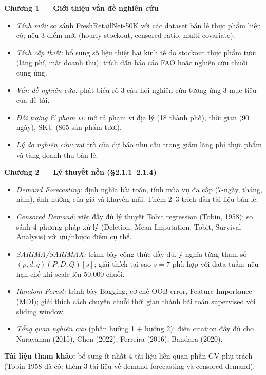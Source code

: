 \documentclass[12pt,a4paper]{report}
\newcommand{\ownerGV}{\colorbox{green!20}{\textbf{[GV] Gia Văn}}}
\begin{document}
\begin{tcolorbox}[colback=green!4, colframe=green!55!black,
    title=\bfseries \ownerGV\ — Nhiệm vụ chi tiết]

\textbf{Chương 1 — Giới thiệu vấn đề nghiên cứu}
\begin{itemize}[leftmargin=1.5em, itemsep=1pt]
    \item[\S1.1] \textit{Tính mới:} so sánh FreshRetailNet-50K với các dataset bán lẻ thực phẩm hiện có; nêu 3 điểm mới (hourly stockout, censored ratio, multi-covariate).
    \item[\S1.2] \textit{Tính cấp thiết:} bổ sung số liệu thiệt hại kinh tế do stockout thực phẩm tươi (lãng phí, mất doanh thu); trích dẫn báo cáo FAO hoặc nghiên cứu chuỗi cung ứng.
    \item[\S1.3] \textit{Vấn đề nghiên cứu:} phát biểu rõ 3 câu hỏi nghiên cứu tương ứng 3 mục tiêu của đề tài.
    \item[\S1.4] \textit{Đối tượng \& phạm vi:} mô tả phạm vi địa lý (18 thành phố), thời gian (90 ngày), SKU (865 sản phẩm tươi).
    \item[\S1.5] \textit{Lý do nghiên cứu:} vai trò của dự báo nhu cầu trong giảm lãng phí thực phẩm và tăng doanh thu bán lẻ.
\end{itemize}

\medskip
\textbf{Chương 2 — Lý thuyết nền (§2.1.1–2.1.4)}
\begin{itemize}[leftmargin=1.5em, itemsep=1pt]
    \item[\S2.1.1] \textit{Demand Forecasting:} định nghĩa bài toán, tính mùa vụ đa cấp (7-ngày, tháng, năm), ảnh hưởng của giá và khuyến mãi. Thêm 2–3 trích dẫn tài liệu bán lẻ.
    \item[\S2.1.2] \textit{Censored Demand:} viết đầy đủ lý thuyết Tobit regression (Tobin, 1958); so sánh 4 phương pháp xử lý (Deletion, Mean Imputation, Tobit, Survival Analysis) với ưu/nhược điểm cụ thể.
    \item[\S2.1.3] \textit{SARIMA/SARIMAX:} trình bày công thức đầy đủ, ý nghĩa từng tham số $(p,d,q)(P,D,Q)[s]$; giải thích tại sao $s=7$ phù hợp với data tuần; nêu hạn chế khi scale lên 50.000 chuỗi.
    \item[\S2.1.4] \textit{Random Forest:} trình bày Bagging, cơ chế OOB error, Feature Importance (MDI); giải thích cách chuyển chuỗi thời gian thành bài toán supervised với sliding window.
    \item[\S2.2] \textit{Tổng quan nghiên cứu} (phần hướng 1 + hướng 2): điền citation đầy đủ cho Narayanan (2015), Chen (2022), Ferreira (2016), Bandara (2020).
\end{itemize}

\medskip
\textbf{Tài liệu tham khảo:} bổ sung ít nhất 4 tài liệu liên quan phần GV phụ trách (Tobin 1958 đã có; thêm 3 tài liệu về demand forecasting và censored demand).

\end{tcolorbox}
\end{document}
